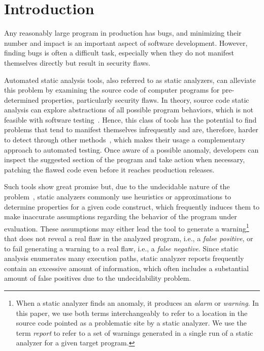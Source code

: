 \chapter{Introduction}
\label{ch:introduction}

Any reasonably large program in production has bugs,
and minimizing their number and impact is an important aspect of software
development. However, finding bugs is often a difficult task, especially when
they do not manifest themselves directly but result in security flaws.

Automated static analysis tools, also referred to as static analyzers, can
alleviate this problem by examining the source code of computer programs for
pre-determined properties, particularly security flaws. In theory, source code
static analysis can explore abstractions of all possible program behaviors,
which is not feasible with software testing~\cite{hovemeyer_finding_2004}.
Hence, this class of tools has the potential to find problems that tend to
manifest themselves infrequently and are, therefore, harder to detect through
other methods~\cite{black2009static}, which makes their usage a complementary
approach to automated testing. Once aware of a possible anomaly, developers can
inspect the suggested section of the program and take action when necessary,
patching the flawed code even before it reaches production releases.

Such tools show great promise but, due to the undecidable nature of the
problem~\cite{landi_undecidability_1992}, static analyzers commonly use
heuristics or approximations to determine properties for a given code
construct, which frequently induces them to make inaccurate assumptions
regarding the behavior of the program under evaluation. These assumptions may
either lead the tool to generate a warning\footnote{When a static analyzer
finds an anomaly, it produces an \emph{alarm} or \emph{warning}. In this paper,
we use both terms interchangeably to refer to a location in the source code
pointed as a problematic site by a static analyzer. We use the term
\emph{report} to refer to a set of warnings generated in a single run of a
static analyzer for a given target program.} that does not reveal a real flaw
in the analyzed program, i.e., a \emph{false positive}, or to fail generating a
warning to a real flaw, i.e., a \emph{false negative}. Since static analysis
enumerates many execution paths, static analyzer reports frequently contain an
excessive amount of information, which often includes a substantial amount of
false positives due to the undecidability problem.

